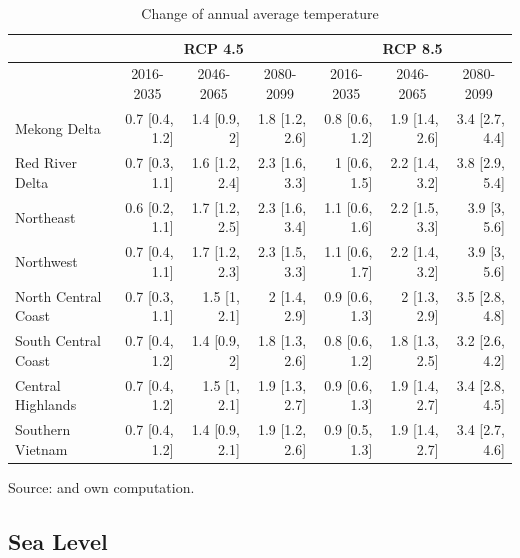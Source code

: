 \documentclass[10pt,a4paper]{article}
\begin{document}
\begin{table}[htbp]
  \begin{center}
	\small
  \caption{Change of annual average temperature}
    \begin{tabular}{l|rrr|rrr}
          & \multicolumn{3}{c|}{RCP 4.5} & \multicolumn{3}{c}{RCP 8.5} \\
    \hline
          & \multicolumn{1}{c}{2016-2035} & \multicolumn{1}{c}{2046-2065} & \multicolumn{1}{c|}{2080-2099} & \multicolumn{1}{c}{2016-2035} & \multicolumn{1}{c}{2046-2065} & \multicolumn{1}{c}{2080-2099} \\
    Mekong Delta & 0.7 [0.4, 1.2] & 1.4 [0.9, 2] & 1.8 [1.2, 2.6] & 0.8 [0.6, 1.2] & 1.9 [1.4, 2.6] & 3.4 [2.7, 4.4] \\
    Red River Delta & 0.7 [0.3, 1.1] & 1.6 [1.2, 2.4] & 2.3 [1.6, 3.3] & 1 [0.6, 1.5] & 2.2 [1.4, 3.2] & 3.8 [2.9, 5.4] \\
    Northeast & 0.6 [0.2, 1.1] & 1.7 [1.2, 2.5] & 2.3 [1.6, 3.4] & 1.1 [0.6, 1.6] & 2.2 [1.5, 3.3] & 3.9 [3, 5.6] \\
    Northwest & 0.7 [0.4, 1.1] & 1.7 [1.2, 2.3] & 2.3 [1.5, 3.3] & 1.1 [0.6, 1.7] & 2.2 [1.4, 3.2] & 3.9 [3, 5.6] \\
    North Central Coast & 0.7 [0.3, 1.1] & 1.5 [1, 2.1] & 2 [1.4, 2.9] & 0.9 [0.6, 1.3] & 2 [1.3, 2.9] & 3.5 [2.8, 4.8] \\
    South Central Coast & 0.7 [0.4, 1.2] & 1.4 [0.9, 2] & 1.8 [1.3, 2.6] & 0.8 [0.6, 1.2] & 1.8 [1.3, 2.5] & 3.2 [2.6, 4.2] \\
    Central Highlands & 0.7 [0.4, 1.2] & 1.5 [1, 2.1] & 1.9 [1.3, 2.7] & 0.9 [0.6, 1.3] & 1.9 [1.4, 2.7] & 3.4 [2.8, 4.5] \\
    Southern Vietnam & 0.7 [0.4, 1.2] & 1.4 [0.9, 2.1] & 1.9 [1.2, 2.6] & 0.9 [0.5, 1.3] & 1.9 [1.4, 2.7] & 3.4 [2.7, 4.6] \\
    \end{tabular}%
  \label{tab:tempscenarios}%
	\end{center}
	\footnotesize{Source: \cite{thuc2016climate} and own computation.}
\end{table}%

\subsection{Sea Level}
\end{document}
